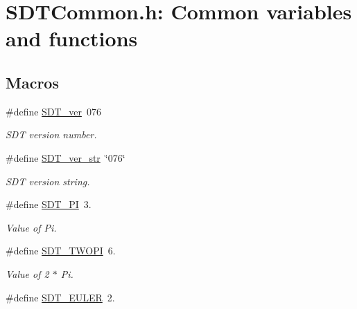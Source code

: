 \hypertarget{group__common}{}\section{S\+D\+T\+Common.\+h\+: Common variables and functions}
\label{group__common}
\subsection*{Macros}
\begin{DoxyCompactItemize}
\item 
\hypertarget{group__common_gab6e61b5e260d784833e230a33efc6a48}{}\#define \hyperlink{group__common_gab6e61b5e260d784833e230a33efc6a48}{S\+D\+T\+\_\+ver}~076\label{group__common_gab6e61b5e260d784833e230a33efc6a48}

\begin{DoxyCompactList}\small\item\em S\+D\+T version number. \end{DoxyCompactList}\item 
\hypertarget{group__common_gaf8d98d86bcb77f3f61403b29483527d5}{}\#define \hyperlink{group__common_gaf8d98d86bcb77f3f61403b29483527d5}{S\+D\+T\+\_\+ver\+\_\+str}~\char`\"{}076\char`\"{}\label{group__common_gaf8d98d86bcb77f3f61403b29483527d5}

\begin{DoxyCompactList}\small\item\em S\+D\+T version string. \end{DoxyCompactList}\item 
\hypertarget{group__common_ga292e893120950fc4c58e10d6a56beeb9}{}\#define \hyperlink{group__common_ga292e893120950fc4c58e10d6a56beeb9}{S\+D\+T\+\_\+\+P\+I}~3.\label{group__common_ga292e893120950fc4c58e10d6a56beeb9}

\begin{DoxyCompactList}\small\item\em Value of Pi. \end{DoxyCompactList}\item 
\hypertarget{group__common_gac8193381f9a9cbb3203c93e0f1cd2502}{}\#define \hyperlink{group__common_gac8193381f9a9cbb3203c93e0f1cd2502}{S\+D\+T\+\_\+\+T\+W\+O\+P\+I}~6.\label{group__common_gac8193381f9a9cbb3203c93e0f1cd2502}

\begin{DoxyCompactList}\small\item\em Value of 2 $\ast$ Pi. \end{DoxyCompactList}\item 
\hypertarget{group__common_ga70e01d4fd1e52279bd5b66f3130551a2}{}\#define \hyperlink{group__common_ga70e01d4fd1e52279bd5b66f3130551a2}{S\+D\+T\+\_\+\+E\+U\+L\+E\+R}~2.\label{group__common_ga70e01d4fd1e52279bd5b66f3130551a2}


\end{DoxyCompactItemize}
